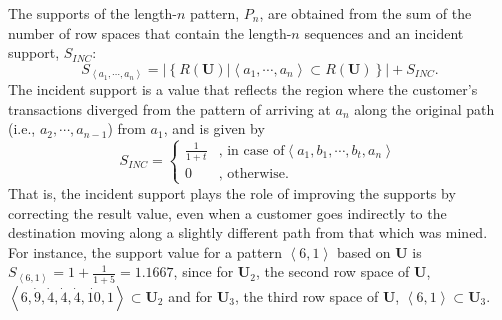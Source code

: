 \documentclass[final,authoryear,5p,times,twocolumn]{elsarticle}
\begin{document}
The supports of the length-$n$ pattern, $P_n$, are obtained from the sum of the number of row spaces that contain the length-$n$ sequences and an incident support, $S_{INC}$:
\begin{equation}
S_{\left \langle a_{1}, \cdots ,a_{n} \right \rangle}
=\left | \left \{ R(\mathbf{U})|\left \langle a_{1}, \cdots ,a_{n} \right \rangle \subset R(\mathbf{U}) \right \} \right |+S_{INC}.
\end{equation}
The incident support is a value that reflects the region where the customer's transactions diverged from the pattern of arriving at $a_n$ along the original path (i.e., $a_2,\cdots,a_{n-1}$) from $a_1$, and is given by
\begin{equation} \label{eq:36}
S_{INC}=\begin{cases}
\frac{1}{1+t} & \text{, in case of}\left \langle a_1,b_1,\cdots,b_t,a_n   \right \rangle  \\
0 & \text{, otherwise}.
\end{cases}
\end{equation}
That is, the incident support plays the role of improving the supports by correcting the result value, even when a customer goes indirectly to the destination moving along a slightly different path from that which was mined. For instance, the support value for a pattern $\left \langle 6,1 \right \rangle$ based on $\mathbf{U}$ is $S_{\left \langle 6,1 \right \rangle} = 1+\frac{1}{1+5} =1.1667$, since for $\mathbf{U}_2$, the second row space of $\mathbf{U}$, $\left \langle 6,\dot9,\dot4,\dot4,\dot4,\dot{10},1 \right \rangle \subset \mathbf{U}_2$ and for $\mathbf{U}_3$, the third row space of $\mathbf{U}$, $\left \langle 6,1 \right \rangle \subset \mathbf{U}_3$.
\end{document}
